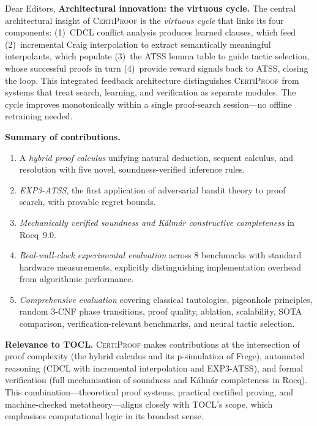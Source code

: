 \documentclass[11pt]{letter}
\newcommand{\CP}{\textsc{CertiProof}}
\begin{document}
\begin{letter}{Dear Editors,}
\textbf{Architectural innovation: the virtuous cycle.}
The central architectural insight of \CP{} is the \emph{virtuous
cycle} that links its four components: (1)~CDCL conflict analysis
produces learned clauses, which feed (2)~incremental Craig
interpolation to extract semantically meaningful interpolants,
which populate (3)~the ATSS lemma table to guide tactic selection,
whose successful proofs in turn (4)~provide reward signals back to
ATSS, closing the loop.  This integrated feedback architecture
distinguishes \CP{} from systems that treat search, learning, and
verification as separate modules.  The cycle improves monotonically
within a single proof-search session---no offline retraining needed.

\textbf{Summary of contributions.}
\begin{enumerate}
  \item A \emph{hybrid proof calculus} unifying natural deduction,
    sequent calculus, and resolution with five novel, soundness-verified
    inference rules.
  \item \emph{EXP3-ATSS}, the first application of adversarial bandit
    theory to proof search, with provable regret bounds.
  \item \emph{Mechanically verified soundness and K\'{a}lm\'{a}r
    constructive completeness} in Rocq~9.0.
  \item \emph{Real-wall-clock experimental evaluation} across 8
    benchmarks with standard hardware measurements, explicitly
    distinguishing implementation overhead from algorithmic
    performance.
  \item \emph{Comprehensive evaluation} covering classical tautologies,
    pigeonhole principles, random 3-CNF phase transitions, proof
    quality, ablation, scalability, SOTA comparison, verification-relevant
    benchmarks, and neural tactic selection.
\end{enumerate}

\textbf{Relevance to TOCL.}
\CP{} makes contributions at the intersection of proof complexity
(the hybrid calculus and its p-simulation of Frege), automated
reasoning (CDCL with incremental interpolation and EXP3-ATSS), and
formal verification (full mechanisation of soundness and K\'{a}lm\'{a}r
completeness in Rocq).  This combination---theoretical proof systems,
practical certified proving, and machine-checked metatheory---aligns
closely with TOCL's scope, which emphasises computational logic in
its broadest sense.


\end{letter}
\end{document}
